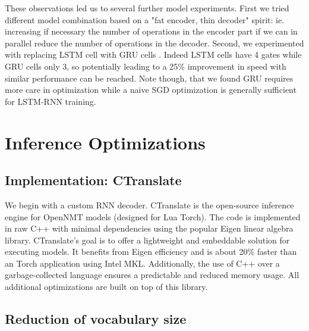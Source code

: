 \documentclass[11pt,a4paper]{article}
\begin{document}
These observations led us to several further model experiments.  First
we tried different model combination based on a "fat encoder, thin
decoder" spirit: ie. increasing if necessary the number of operations
in the encoder part if we can in parallel reduce the number of
operations in the decoder. Second, we experimented with replacing LSTM
cell with GRU cells \cite{DBLP:journals/corr/ChoMGBSB14}. Indeed LSTM
cells have 4 gates while GRU cells only 3, so potentially leading to a
25\% improvement in speed with similar performance can be
reached. Note though, that we found GRU requires more care in optimization
while a naive SGD optimization is generally sufficient for
LSTM-RNN training.

\section{Inference Optimizations}




\subsection{Implementation: CTranslate}

We begin with a custom RNN decoder.  CTranslate is the open-source
inference engine for OpenNMT models (designed for Lua Torch).  The
code is implemented in raw C++ with minimal dependencies using the
popular Eigen linear algebra library. CTranslate's goal is to offer a
lightweight and embeddable solution for executing models. It benefits
from Eigen efficiency and is about 20\% faster than an Torch
application using Intel MKL. Additionally, the use of C++ over a
garbage-collected language ensures a predictable and reduced memory
usage. All additional optimizations are built on top of this library.


\subsection{Reduction of vocabulary size}
\end{document}
